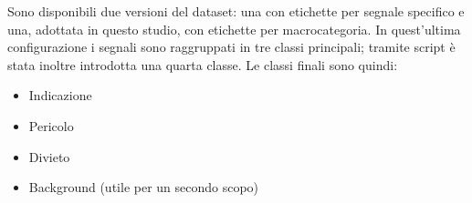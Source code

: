 Sono disponibili due versioni del dataset: una con etichette per segnale specifico e una, adottata in questo studio, con etichette per macrocategoria. In quest'ultima configurazione i segnali sono raggruppati in tre classi principali; tramite script è stata inoltre introdotta una quarta classe. Le classi finali sono quindi:

\begin{itemize}
    \item Indicazione
    \item Pericolo
    \item Divieto
    \item Background (utile per un secondo scopo)
\end{itemize}